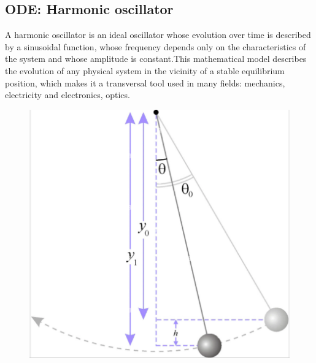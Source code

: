 \documentclass[12pt]{article}
\begin{document}
	\subsection{ODE: Harmonic oscillator}
	\label{oscillator_ode}
	\noindent A harmonic oscillator is an ideal oscillator whose evolution over time is described by a sinusoidal function, whose frequency depends only on the characteristics of the system and whose amplitude is constant.This mathematical model describes the evolution of any physical system in the vicinity of a stable equilibrium position, which makes it a transversal tool used in many fields: mechanics, electricity and electronics, optics.
	\begin{figure}[H]       
	\begin{minipage}[t]{0.46\linewidth}
		\centering
		\includegraphics[width=\linewidth]{"images/Diff_equation/Harmonic_oss_1.png"}
	\end{minipage} \hfill
	\begin{minipage}[t]{0.48\linewidth}
		\centering

\end{minipage}
\end{figure}
\end{document}
